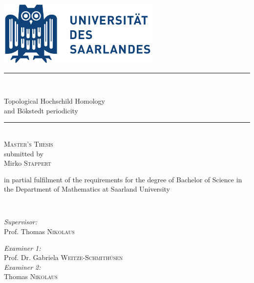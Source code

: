\begin{titlepage}
\begin{center}

\vspace*{.1\textheight}
\includegraphics[width=8cm,keepaspectratio]{logo}\\[0.5cm]

\rule{.9\linewidth}{.6pt} \\[0.4cm] %
{\huge \bfseries
\begin{center}
Topological Hochschild Homology \\
and Bökstedt periodicity
\end{center} \par}%
\rule{.9\linewidth}{.6pt} \\[0.4cm] %
\textsc{\large Master's Thesis}\\[0.5cm] %

\small submitted by\\[0.5cm]

\Large Mirko \textsc{Stappert}\\[0.5cm]

\begin{minipage}[t]{0.45\textwidth}
\begin{center}
{\small in partial fulfilment of the requirements for the degree of Bachelor of Science in the Department of Mathematics at Saarland University}
\end{center}
\end{minipage}\\[2cm]

\begin{minipage}[t]{0.4\textwidth}
\begin{flushleft} \large
\emph{Supervisor:}\\
Prof. Thomas \textsc{Nikolaus }\\[0.5cm]

\end{flushleft}
\end{minipage}
\begin{minipage}[t]{0.4\textwidth}
\begin{flushright} \large
\emph{Examiner 1:} \\
Prof. Dr. Gabriela \textsc{Weitze-Schmithüsen}\\[0.5cm]
\emph{Examiner 2:}\\
Thomas \textsc{Nikolaus}
\end{flushright}
\end{minipage}\\[3cm]

\vfill



\vfill
\end{center}
\end{titlepage}

